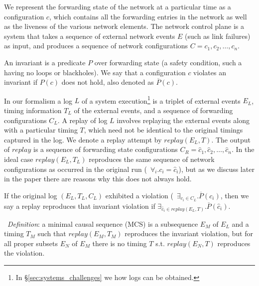 We represent the forwarding state of the network
at a particular time as a configuration $c$, which contains all the forwarding
entries in the network
as well as the liveness of the various network elements.
The network control plane is a system that takes a sequence of
external network events $E$ (such as link failures) as input,
and produces a sequence of network configurations
$C = c_1,c_2,\dots,c_n$.

An invariant is a predicate $P$ over forwarding state (a safety
condition, such a having no loops or blackholes). We say that a configuration
$c$ violates an invariant if $P(c)$ does not
hold, also denoted as $\overline{P}(c)$.

In our formalism a log $L$ of a system execution\footnote{In
\S\ref{sec:systems_challenges} we how logs can be obtained.} is a triplet of external events $E_L$,
timing information $T_L$ of the external events, and a sequence of forwarding
configurations $C_L$.
A replay of log $L$ involves replaying the external events along with a
particular timing $T$,
which need not be identical to the original timings captured in the log.
We denote a replay attempt by $replay(E_L,T)$.
The output of $replay$ is a sequence of forwarding state configurations
$C_R = \hat{c}_1,\hat{c}_2,\dots,\hat{c}_n$. In the ideal case $replay(E_L,T_L)$ reproduces the same
sequence of network configurations as occurred in the original run
(\ie~$\forall_i. c_i = \hat{c}_i$), but as we discuss later in the paper there are reasons why
this does not always hold.

If the original log $(E_L, T_L, C_L)$ exhibited a violation
(\ie~$\exists_{c_i \in C_L}. \overline{P}(c_i)$,
then we say a replay reproduces that invariant violation if
$\exists_{\hat{c}_i \in replay(E_L,T)}. \overline{P}(\hat{c}_i)$.

\noindent~{\em Definition}: a minimal causal sequence (MCS) is a subsequence $E_M$
of $E_L$ and a timing $T_M$ such
that $replay(E_M,T_M)$ reproduces the invariant violation, but for all proper
subsets $E_N$ of $E_M$
there is no timing $T$ s.t. $replay(E_N,T)$ reproduces the violation.
